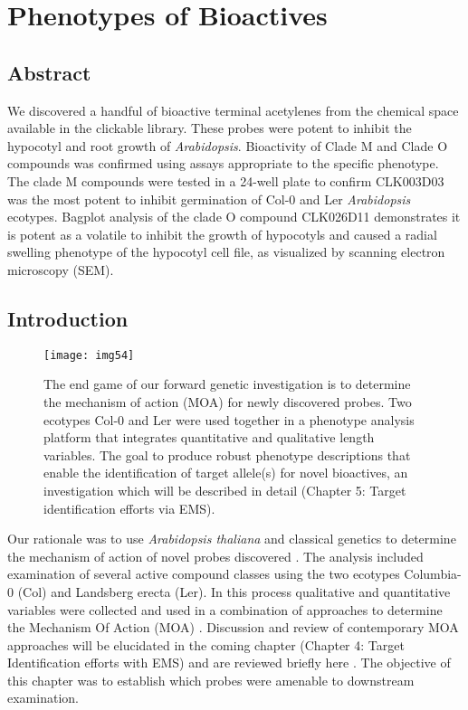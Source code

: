 \chapter{Phenotypes of Bioactives}


\section{Abstract}

We discovered a handful of bioactive terminal acetylenes from the chemical space available in the clickable library. These probes were potent to inhibit the hypocotyl and root growth of {\it Arabidopsis}. Bioactivity of Clade M and Clade O compounds was confirmed using assays appropriate to the specific phenotype. The clade M compounds were tested in a 24-well plate to confirm CLK003D03 was the most potent to inhibit germination of Col-0 and Ler {\it Arabidopsis} ecotypes. Bagplot analysis of the clade O compound CLK026D11 demonstrates it is potent as a volatile to inhibit the growth of hypocotyls and caused a radial swelling phenotype of the hypocotyl cell file, as visualized by scanning electron microscopy (SEM). 

\section{Introduction}

\begin{figure}
\texttt{[image: img54]}
\caption{The end game of our forward genetic investigation is to determine the mechanism of action (MOA) for newly discovered probes. Two ecotypes Col-0 and Ler were used together in a phenotype analysis platform that integrates quantitative and qualitative length variables. The goal to produce robust phenotype descriptions that enable the identification of target allele(s) for novel bioactives, an investigation which will be described in detail (Chapter 5: Target identification efforts via EMS).}
\label{fig:MOA}
\end{figure}


Our rationale was to use {\it Arabidopsis thaliana} and classical genetics to determine the mechanism of action of novel probes discovered \cite{dai2005genetic,grozinger2001identification}. The analysis included examination of several active compound classes using the two ecotypes Columbia-0 (Col) and Landsberg erecta (Ler)\cite{Zhao_Hyr1}. In this process qualitative and quantitative variables were collected and used in a combination of approaches to determine the Mechanism Of Action (MOA) \cite{lukowitz2000positional}. Discussion and review of contemporary MOA approaches will be elucidated in the coming chapter (Chapter 4: Target Identification efforts with EMS) and are reviewed briefly here \cite{blackwell2003chemical}. The objective of this chapter was to establish which probes were amenable to downstream examination. 

